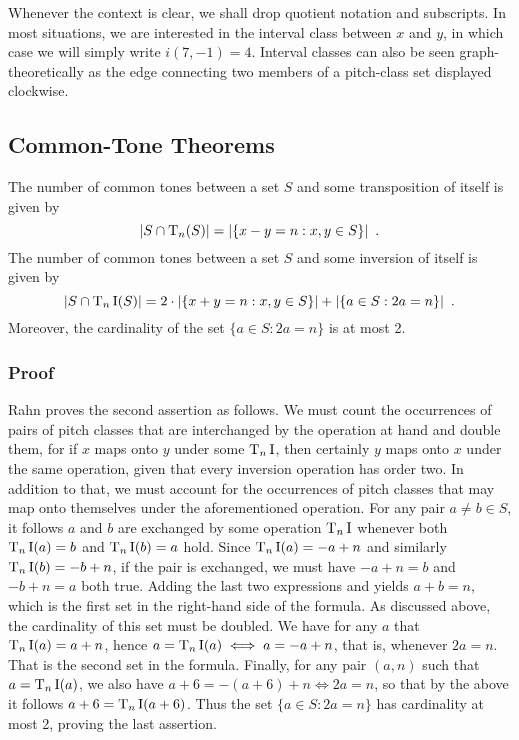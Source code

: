Whenever the context is clear, we shall drop quotient notation and subscripts. In most situations, we are interested in the interval class between $x$ and $y$, in which case we will simply write $i(7, -1) = 4$. Interval classes can also be seen graph-theoretically as the edge connecting two members of a pitch-class set displayed clockwise.

\subsection{Common-Tone Theorems}

The number of common tones between a set $S$ and some transposition of itself is given by
$$
|S \cap \operatorname{T}_n(S)| = |\{x - y = n : x, y \in S\}| \enspace.
$$
The number of common tones between a set $S$ and some inversion of itself is given by
$$
|S \cap \operatorname{T}_n\operatorname{I}(S)| = 2 \cdot |\{x + y = n : x, y \in S\}| + |\{a \in S : 2a = n\}| \enspace.
$$
Moreover, the cardinality of the set $\{a \in S : 2a = n\}$ is at most 2.

\subsubsection{Proof}

Rahn \cite{10.2307/832090} proves the second assertion as follows. We must count the occurrences of pairs of pitch classes that are interchanged by the operation at hand and double them, for if $x$ maps onto $y$ under some $\operatorname{T}_n\operatorname{I}$, then certainly $y$ maps onto $x$ under the same operation, given that every inversion operation has order two. In addition to that, we must account for the occurrences of pitch classes that may map onto themselves under the aforementioned operation. For any pair $a \ne b \in S$, it follows $a$ and $b$ are exchanged by some operation $\operatorname{T}_n\operatorname{I}$ whenever both $\operatorname{T}_n\operatorname{I}(a) = b$ and $\operatorname{T}_n\operatorname{I}(b) = a$ hold. Since $\operatorname{T}_n\operatorname{I}(a) = -a + n$ and similarly $\operatorname{T}_n\operatorname{I}(b) = -b + n$, if the pair is exchanged, we must have $-a + n = b$ and $-b + n = a$ both true. Adding the last two expressions and yields $a + b = n$, which is the first set in the right-hand side of the formula. As discussed above, the cardinality of this set must be doubled. We have for any $a$ that $\operatorname{T}_n\operatorname{I}(a) = a + n$, hence $a = \operatorname{T}_n\operatorname{I}(a) \iff a = -a + n$, that is, whenever $2a = n$. That is the second set in the formula. Finally, for any pair $(a, n)$ such that $a = \operatorname{T}_n\operatorname{I}(a)$, we also have $a + 6 = -(a + 6) + n \iff 2a = n$, so that by the above it follows $a + 6 = \operatorname{T}_n\operatorname{I}(a + 6)$. Thus the set $\{a \in S : 2a = n\}$ has cardinality at most 2, proving the last assertion.

